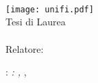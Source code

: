 \begin{titlepage}
	\begin{center}
		\large
		\hfill
		\vfill
		\begingroup
			\spacedallcaps{\myUni}\\
			\myFaculty \\
			\myDegree \\ 
			\vspace{0.5cm}
			\texttt{[image: unifi.pdf]}\\
			\vspace{0.5cm}
			Tesi di Laurea
		\endgroup
		\vfill
		\begingroup
			\color{Maroon}\spacedallcaps{\myTitle}\\
			\spacedlowsmallcaps{\mySubtitle}\\
			\bigskip
		\endgroup
		\spacedlowsmallcaps{\myName}
		\vfill
		Relatore: \textit{\myProf}\\
		\vfill
		\myTime
		\vfill
	\end{center}
\end{titlepage}
\newpage
	\thispagestyle{empty}
	\hfill
	\vfill
	\noindent\myName: \textit{\myTitle: \mySubtitle,} \myDegree, \textcopyright\ \myTime
